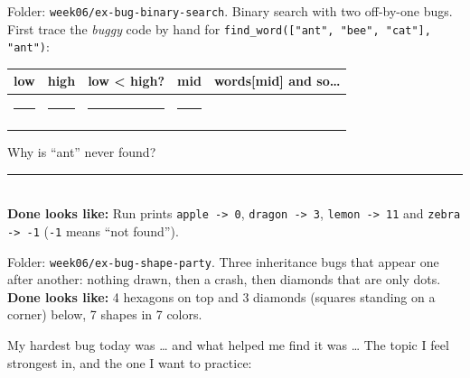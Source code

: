\begin{exercise}
Folder: \texttt{week06/ex-bug-binary-search}. Binary search with two off-by-one bugs. First trace the \emph{buggy} code by hand for \texttt{find\_word(["ant", "bee", "cat"], "ant")}:
\begin{center}
\renewcommand{\arraystretch}{1.4}
\begin{tabular}{|c|c|c|c|p{5.2cm}|}
\hline
\textbf{low} & \textbf{high} & \textbf{low < high?} & \textbf{mid} & \textbf{words[mid] and so\ldots} \\ \hline
\rule{1cm}{0pt} & \rule{1cm}{0pt} & \rule{1.8cm}{0pt} & \rule{1cm}{0pt} & \\ \hline
 & & & & \\ \hline
\end{tabular}
\end{center}
Why is \enquote{ant} never found? \rule{7cm}{0.4pt}\\
\textbf{Done looks like:} Run prints \texttt{apple -> 0}, \texttt{dragon -> 3}, \texttt{lemon -> 11} and \texttt{zebra -> -1} (\texttt{-1} means \enquote{not found}).
\end{exercise}

\begin{exercise}
Folder: \texttt{week06/ex-bug-shape-party}. Three inheritance bugs that appear one after another: nothing drawn, then a crash, then diamonds that are only dots.\\
\textbf{Done looks like:} 4 hexagons on top and 3 diamonds (squares standing on a corner) below, 7 shapes in 7 colors.
\end{exercise}

\begin{vocab}
\end{vocab}

\begin{reflection}
My hardest bug today was \ldots{} and what helped me find it was \ldots
{}
The topic I feel strongest in, and the one I want to practice:
\end{reflection}
